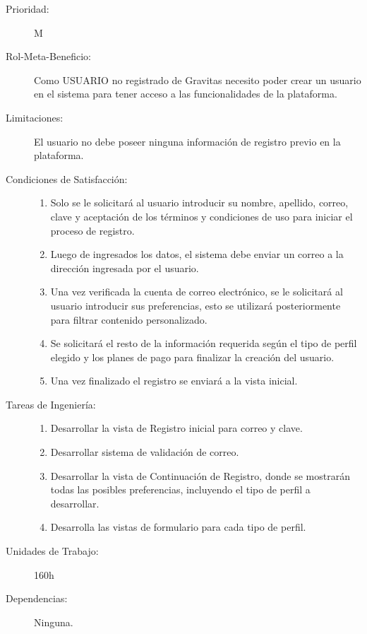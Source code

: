 \begin{description}
    \item[Prioridad:] M
    \item[Rol-Meta-Beneficio:] Como USUARIO no registrado de Gravitas necesito poder crear un usuario en el sistema para tener acceso a las funcionalidades de la plataforma.
    \item[Limitaciones:] El usuario no debe poseer ninguna información de registro previo en la plataforma.
    \item[Condiciones de Satisfacción:] \hfill
        \begin{enumerate}
            \item Solo se le solicitará al usuario introducir su nombre, apellido, correo, clave y aceptación de los términos y condiciones de uso para iniciar el proceso de registro.
            \item Luego de ingresados los datos, el sistema debe enviar un correo a la dirección ingresada por el usuario.
            \item Una vez verificada la cuenta de correo electrónico, se le solicitará al usuario introducir sus preferencias, esto se utilizará posteriormente para filtrar contenido personalizado.
            \item Se solicitará el resto de la información requerida según el tipo de perfil elegido y los planes de pago para finalizar la creación del usuario.
            \item Una vez finalizado el registro se enviará a la vista inicial.
        \end{enumerate}
    \item[Tareas de Ingeniería:] \hfill
        \begin{enumerate}
            \item Desarrollar la vista de Registro inicial para correo y clave.
            \item Desarrollar sistema de validación de correo.
            \item Desarrollar la vista de Continuación de Registro, donde se mostrarán todas las posibles preferencias, incluyendo el tipo de perfil a desarrollar.
            \item Desarrolla las vistas de formulario para cada tipo de perfil.
        \end{enumerate}
    \item[Unidades de Trabajo:] 160h
    \item[Dependencias:] Ninguna.
\end{description}

